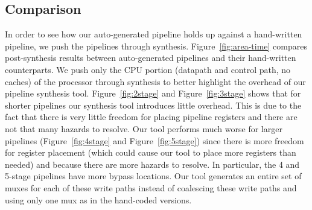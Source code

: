 \subsection{Comparison}
In order to see how our auto-generated pipeline holds up against a
hand-written pipeline, we push the pipelines through
synthesis. Figure~\ref{fig:area-time} compares post-synthesis results
between auto-generated pipelines and their hand-written
counterparts. We push only the CPU portion (datapath and control path,
no caches) of the processor through synthesis to better highlight the
overhead of our pipeline synthesis tool. Figure~\ref{fig:2stage} and
Figure~\ref{fig:3stage} shows that for shorter pipelines our synthesis
tool introduces little overhead. This is due to the fact that there is
very little freedom for placing pipeline registers and there are not
that many hazards to resolve. Our tool performs much worse for larger
pipelines (Figure~\ref{fig:4stage} and Figure~\ref{fig:5stage}) since
there is more freedom for register placement (which could cause our
tool to place more registers than needed) and because there are more
hazards to resolve. In particular, the 4 and 5-stage pipelines have
more bypass locations. Our tool generates an entire set of muxes for
each of these write paths instead of coalescing these write paths and
using only one mux as in the hand-coded versions.
